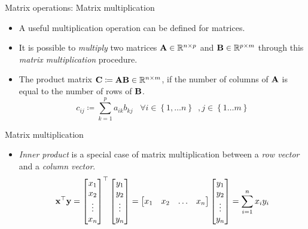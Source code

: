 \documentclass[aspectratio=169]{beamer}
\begin{document}
\begin{frame}[t]{Matrix operations: Matrix multiplication}
  \begin{itemize}
    \item A useful multiplication operation can be defined for matrices.
    \item It is possible to \textit{multiply} two matrices $\mathbf{A} \in \mathbb{R}^{n\times p}$ and $\mathbf{B} \in \mathbb{R}^{p\times m}$ through this \textit{matrix multiplication} procedure.
    \item The product matrix $\mathbf{C} \coloneqq \mathbf{A}\mathbf{B} \in \mathbb{R}^{n \times m}$, if the number of columns of $\mathbf{A}$ is equal to the number of rows of $\mathbf{B}$.
    \[ c_{ij} \coloneqq \sum_{k=1}^{p} a_{ik}b_{kj} \,\,\,\,\, \forall i \in \left\{1, \ldots n\right\}\,\,\, , j \in \left\{1 \ldots m\right\} \]
  \end{itemize}
\end{frame}

\begin{frame}[t]{Matrix multiplication}
  \begin{itemize}
    \item \textit{Inner product} is a special case of matrix multiplication between a \textit{row vector} and a \textit{column vector}.
    \[ \mathbf{x}^{\top}\mathbf{y} = \begin{bmatrix}
      x_1 \\ x_2 \\ \vdots \\x_n
    \end{bmatrix}^{\top}\begin{bmatrix}
      y_1 \\ y_2 \\ \vdots \\y_n
    \end{bmatrix} = \begin{bmatrix}
      x_1 & x_2 & \ldots &x_n
    \end{bmatrix}\begin{bmatrix}
      y_1 \\ y_2 \\ \vdots \\y_n
    \end{bmatrix} = \sum_{i=1}^nx_iy_i\]
  \end{itemize}
\end{frame}
\end{document}
